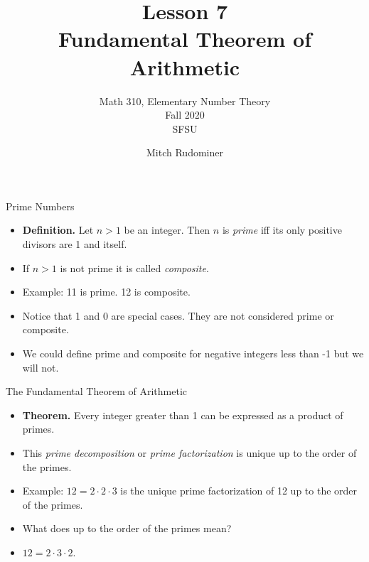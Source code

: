 \documentclass{beamer}
\title{Lesson 7 \\ Fundamental Theorem of Arithmetic}
\subtitle{Math 310, Elementary Number Theory \\ Fall 2020 \\ SFSU}
\author{Mitch Rudominer}
\date{}
\begin{document}
\begin{frame}
  \titlepage
\end{frame}


\begin{frame}{Prime Numbers}

\begin{itemize}
  \item \textbf{Definition.} Let $n>1$ be an integer. Then $n$ is \emph{prime} iff its only positive divisors are 1 and itself.
  \item If $n>1$ is not prime it is called \emph{composite}.
  \item Example: 11 is prime. 12 is composite.
  \item Notice that 1 and 0 are special cases. They are not considered prime or composite.
  \item We could define prime and composite for negative integers less than -1 but we will not.
\end{itemize}

\end{frame}


\begin{frame}{The Fundamental Theorem of Arithmetic}

\begin{itemize}
  \item \textbf{Theorem.} Every integer greater than 1 can be expressed as a product of primes.
  \item This \emph{prime decomposition} or \emph{prime factorization} is unique up to the order of the primes.
  \item Example: $12 = 2\cdot 2 \cdot 3$ is the unique prime factorization of 12 up to the order of the primes.
  \item What does up to the order of the primes mean?
  \item $12 = 2 \cdot 3 \cdot 2$.
\end{itemize}

\end{frame}
\end{document}
